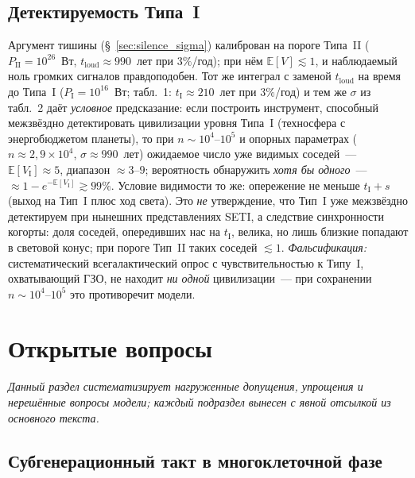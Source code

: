 \documentclass[12pt,a4paper]{article}
\begin{document}
\subsection{Детектируемость Типа~I}\label{sec:pred_type1}

Аргумент тишины (\S~\ref{sec:silence_sigma}) калиброван на пороге Типа~II ($P_{\mathrm{II}} = 10^{26}$~Вт, $t_{\mathrm{loud}} \approx 990$~лет при $3\%$/год); при нём $\mathbb{E}[V] \lesssim 1$, и наблюдаемый ноль громких сигналов правдоподобен. Тот же интеграл с заменой $t_{\mathrm{loud}}$ на время до Типа~I ($P_{\mathrm{I}} = 10^{16}$~Вт; табл.~1: $t_{\mathrm{I}} \approx 210$~лет при $3\%$/год) и тем же $\sigma$ из табл.~2 даёт \emph{условное} предсказание: если построить инструмент, способный межзвёздно детектировать цивилизации уровня Типа~I (техносфера с энергобюджетом планеты), то при $n \sim 10^4$--$10^5$ и опорных параметрах ($n \approx 2{,}9\times10^4$, $\sigma \approx 990$~лет) ожидаемое число уже видимых соседей~--- $\mathbb{E}[V_{\mathrm{I}}] \approx 5$, диапазон $\approx 3$--$9$; вероятность обнаружить \emph{хотя бы одного}~--- $\approx 1 - e^{-\mathbb{E}[V_{\mathrm{I}}]} \gtrsim 99\%$. Условие видимости то же: опережение не меньше $t_{\mathrm{I}} + s$ (выход на Тип~I плюс ход света). Это \emph{не} утверждение, что Тип~I уже межзвёздно детектируем при нынешних представлениях SETI, а следствие синхронности когорты: доля соседей, опередивших нас на $t_{\mathrm{I}}$, велика, но лишь близкие попадают в световой конус; при пороге Тип~II таких соседей $\lesssim 1$. \emph{Фальсификация:} систематический всегалактический опрос с чувствительностью к Типу~I, охватывающий ГЗО, не находит \emph{ни одной} цивилизации~--- при сохранении $n \sim 10^4$--$10^5$ это противоречит модели.

\section{Открытые вопросы}
\label{sec:open}

\textit{Данный раздел систематизирует нагруженные допущения, упрощения и нерешённые вопросы модели; каждый подраздел вынесен с явной отсылкой из основного текста.}

\subsection{Субгенерационный такт в многоклеточной фазе}
\label{sec:macro_tempo}
\end{document}
